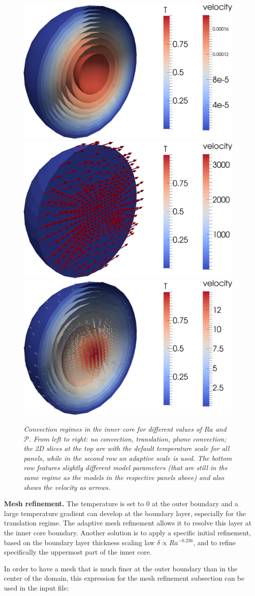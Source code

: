 \documentclass{article}
\begin{document}
\begin{figure}[h]
\begin{center}
   \vspace{1cm}
    \includegraphics[width=0.25\linewidth]{cookbooks/inner_core_convection/doc/no_convection.png}
    \includegraphics[width=0.25\linewidth]{cookbooks/inner_core_convection/doc/translation.png}
    \includegraphics[width=0.25\linewidth]{cookbooks/inner_core_convection/doc/convection.png}
    \caption{\it Convection regimes in the inner core for different values of $Ra$ and $\mathcal{P}$. From left to right: no convection, translation, plume convection; the 2D slices at the top are with the default temperature scale for all panels, while in the second row an adaptive scale is used. The bottom row features slightly different model parameters (that are still in the same regime as the models in the respective panels above) and also shows the velocity as arrows.}
    \label{fig:inner-core-regimes}
       \end{center}
\end{figure}

\vspace{0.3cm}
\textbf{Mesh refinement.}
The temperature is set to 0 at the outer boundary and a large temperature gradient can develop at the boundary layer, especially for the translation regime. The adaptive mesh refinement allows it to resolve this layer at the inner core boundary. Another solution is to apply a specific initial refinement, based on the boundary layer thickness scaling law $\delta \propto Ra^{-0.236}$, and to refine specifically the uppermost part of the inner core.

In order to have a mesh that is much finer at the outer boundary than in the center of the domain, this expression for the mesh refinement subsection can be used in the input file:

\end{document}
